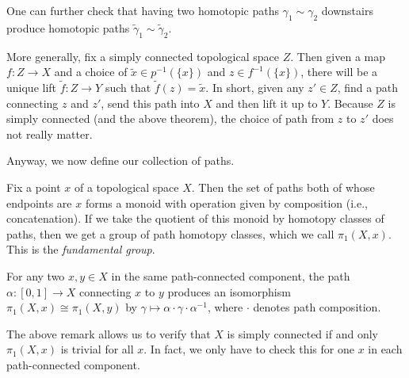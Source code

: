 \documentclass[../notes.tex]{subfiles}
\begin{document}
\begin{remark}
	One can further check that having two homotopic paths $\gamma_1\sim\gamma_2$ downstairs produce homotopic paths $\widetilde\gamma_1\sim\widetilde\gamma_2$. 
\end{remark}
\begin{remark} \label{rem:map-out-simply-connected}
	More generally, fix a simply connected topological space $Z$. Then given a map $f\colon Z\to X$ and a choice of $\widetilde x\in p^{-1}(\{x\})$ and $z\in f^{-1}(\{x\})$, there will be a unique lift $\widetilde f\colon Z\to Y$ such that $\widetilde f(z)=\widetilde x$. In short, given any $z'\in Z$, find a path connecting $z$ and $z'$, send this path into $X$ and then lift it up to $Y$. Because $Z$ is simply connected (and the above theorem), the choice of path from $z$ to $z'$ does not really matter.
\end{remark}
Anyway, we now define our collection of paths.
\begin{definition}
	Fix a point $x$ of a topological space $X$. Then the set of paths both of whose endpoints are $x$ forms a monoid with operation given by composition (i.e., concatenation). If we take the quotient of this monoid by homotopy classes of paths, then we get a group of path homotopy classes, which we call $\pi_1(X,x)$. This is the \textit{fundamental group}.
\end{definition}
\begin{remark}
	For any two $x,y\in X$ in the same path-connected component, the path $\alpha\colon[0,1]\to X$ connecting $x$ to $y$ produces an isomorphism $\pi_1(X,x)\cong\pi_1(X,y)$ by $\gamma\mapsto\alpha\cdot\gamma\cdot\alpha^{-1}$, where $\cdot$ denotes path composition.
\end{remark}
\begin{remark}
	The above remark allows us to verify that $X$ is simply connected if and only $\pi_1(X,x)$ is trivial for all $x$. In fact, we only have to check this for one $x$ in each path-connected component.
\end{remark}
\end{document}
